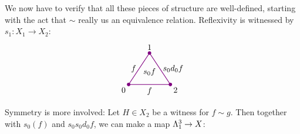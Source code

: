        We now have to verify that all these pieces of structure are well-defined, starting with the act that $\sim$ really us an equivalence relation.
        Reflexivity is witnessed by $s_1 \colon X_1 \to X_2$:
        \begin{equation*}
            \begin{tikzpicture}[
                scale=0.9, 
                thick, 
                color=violet, 
                every node/.style={text=black},
                dot/.style={circle, fill=violet, inner sep=1.5pt, outer sep=0pt}
            ]

                \coordinate (O) at (0,0);       %
                \coordinate (A) at (1, 1.5);    %
                \coordinate (B) at (2, 0);      %

                \draw (O) -- node[left] {$f$} (A) 
                    -- node[right] {$s_0 d_0 f$} (B) 
                    -- node[below] {$f$} cycle;

                \node[dot] at (O) {};
                \node[dot] at (A) {};
                \node[dot] at (B) {};

                \node[below left] at (O) {0};
                \node[above] at (A) {1};
                \node[below right] at (B) {2};

                \node[scale=1.0] at (1, 0.6) {$s_0 f$};

            \end{tikzpicture}
        \end{equation*}
        Symmetry is more involved: Let $H \in X_2$ be a witness for $f \sim g$. Then together with $s_0(f)$ and $s_0 s_0 d_0 f$, we can make a map $\Lambda^{3}_{1} \to X$:
